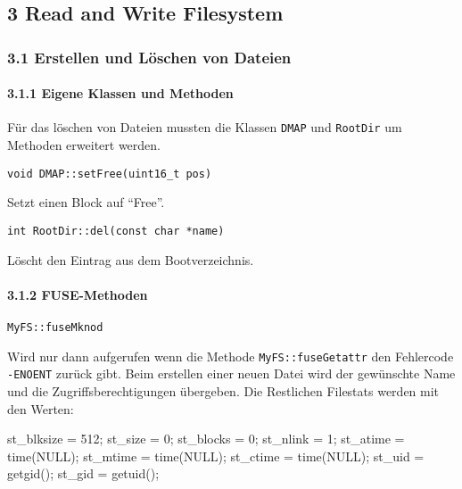 \documentclass[]{article}
\newenvironment{Shaded}{}{}
\newcommand{\DecValTok}[1]{\textcolor[rgb]{0.25,0.63,0.44}{#1}}
\newcommand{\NormalTok}[1]{#1}
\let\oldparagraph\paragraph
\renewcommand{\paragraph}[1]{\oldparagraph{#1}\mbox{}}
\begin{document}
\hypertarget{read-and-write-filesystem}{%
\subsection{3 Read and Write
Filesystem}\label{read-and-write-filesystem}}

\hypertarget{erstellen-und-luxf6schen-von-dateien}{%
\subsubsection{3.1 Erstellen und Löschen von
Dateien}\label{erstellen-und-luxf6schen-von-dateien}}

\hypertarget{eigene-klassen-und-methoden-1}{%
\paragraph{3.1.1 Eigene Klassen und
Methoden}\label{eigene-klassen-und-methoden-1}}

Für das löschen von Dateien mussten die Klassen \texttt{DMAP} und
\texttt{RootDir} um Methoden erweitert werden.

\texttt{void\ DMAP::setFree(uint16\_t\ pos)}

Setzt einen Block auf ``Free''.

\texttt{int\ RootDir::del(const\ char\ *name)}

Löscht den Eintrag aus dem Bootverzeichnis.


\hypertarget{fuse-methoden-1}{%
\paragraph{3.1.2 FUSE-Methoden}\label{fuse-methoden-1}}

\texttt{MyFS::fuseMknod}

Wird nur dann aufgerufen wenn die Methode \texttt{MyFS::fuseGetattr} den
Fehlercode \texttt{-ENOENT} zurück gibt. Beim erstellen einer neuen
Datei wird der gewünschte Name und die Zugriffsberechtigungen übergeben.
Die Restlichen Filestats werden mit den Werten:

\begin{Shaded}
  \begin{framed}
\begin{Highlighting}[]
\NormalTok{st_blksize = }\DecValTok{512}\NormalTok{;}
\NormalTok{st_size = }\DecValTok{0}\NormalTok{;}
\NormalTok{st_blocks = }\DecValTok{0}\NormalTok{;}
\NormalTok{st_nlink = }\DecValTok{1}\NormalTok{;}
\NormalTok{st_atime = time(NULL);}
\NormalTok{st_mtime = time(NULL);}
\NormalTok{st_ctime = time(NULL);}
\NormalTok{st_uid = getgid();}
\NormalTok{st_gid = getuid();}
\end{Highlighting}
\end{framed}
\end{Shaded}
\end{document}
